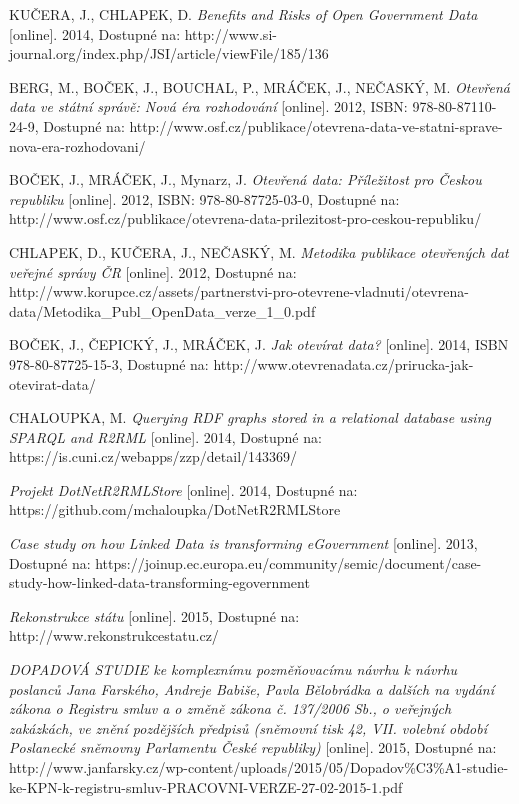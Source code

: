 \begin{thebibliography}{99}
  KUČERA, J., CHLAPEK, D.
  \emph{Benefits and Risks of Open Government Data} 
  [online]. 2014, Dostupné na: 
  http://www.si-journal.org/index.php/JSI/article/viewFile/185/136
  
  BERG, M., BOČEK, J., BOUCHAL, P., MRÁČEK, J., NEČASKÝ, M.
  \emph{Otevřená data ve státní správě: Nová éra rozhodování} 
  [online]. 2012, ISBN: 978-80-87110-24-9, Dostupné na: 
  http://www.osf.cz/publikace/otevrena-data-ve-statni-sprave-nova-era-rozhodovani/
 
  BOČEK, J., MRÁČEK, J., Mynarz, J.
  \emph{Otevřená data: Příležitost pro Českou republiku} 
  [online]. 2012, ISBN: 978-80-87725-03-0, Dostupné na: 
  http://www.osf.cz/publikace/otevrena-data-prilezitost-pro-ceskou-republiku/
  
  CHLAPEK, D., KUČERA, J., NEČASKÝ, M.
  \emph{Metodika publikace otevřených dat veřejné správy ČR } 
  [online]. 2012, Dostupné na: 
  http://www.korupce.cz/assets/partnerstvi-pro-otevrene-vladnuti/otevrena-data/Metodika\_Publ\_OpenData\_verze\_1\_0.pdf
  
  BOČEK, J., ČEPICKÝ, J., MRÁČEK, J.
  \emph{Jak otevírat data?} 
  [online]. 2014, ISBN 978-80-87725-15-3, Dostupné na: 
  http://www.otevrenadata.cz/prirucka-jak-otevirat-data/
  
  CHALOUPKA, M.
  \emph{Querying RDF graphs stored in a relational database using SPARQL and R2RML} 
  [online]. 2014, Dostupné na: 
  https://is.cuni.cz/webapps/zzp/detail/143369/
  
  \emph{Projekt DotNetR2RMLStore} 
  [online]. 2014, Dostupné na: 
  https://github.com/mchaloupka/DotNetR2RMLStore

  \emph{Case study on how Linked Data is transforming eGovernment} 
  [online]. 2013, Dostupné na: 
  https://joinup.ec.europa.eu/community/semic/document/case-study-how-linked-data-transforming-egovernment

  \emph{Rekonstrukce státu} 
  [online]. 2015, Dostupné na: 
  http://www.rekonstrukcestatu.cz/ 
  
  \emph{DOPADOVÁ STUDIE
ke komplexnímu pozměňovacímu návrhu k návrhu poslanců Jana Farského, Andreje
Babiše, Pavla Bělobrádka a dalších na vydání zákona o Registru smluv a o změně
zákona č. 137/2006 Sb., o veřejných zakázkách, ve znění pozdějších předpisů (sněmovní tisk 42, VII. volební období Poslanecké sněmovny Parlamentu České republiky)} 
  [online]. 2015, Dostupné na: 
  http://www.janfarsky.cz/wp-content/uploads/2015/05/Dopadov\%C3\%A1-studie-ke-KPN-k-registru-smluv-PRACOVNI-VERZE-27-02-2015-1.pdf
  

\end{thebibliography}
